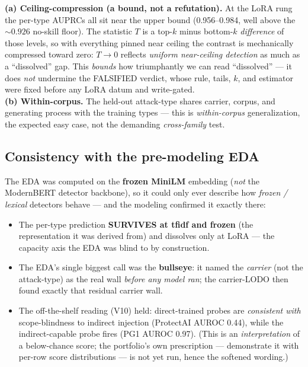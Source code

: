 \documentclass[11pt,parskip=half-]{scrartcl}
\newcommand{\arr}{\ensuremath{\rightarrow}}
\begin{document}
\begin{insightbox}
\textbf{(a) Ceiling-compression (a bound, not a refutation).} At the LoRA rung the per-type AUPRCs all
sit near the upper bound (0.956--0.984, well above the ${\sim}0.926$ no-skill floor). The statistic
$T$ is a top-$k$ minus bottom-$k$ \emph{difference} of those levels, so with everything pinned near
ceiling the contrast is mechanically compressed toward zero: $T\arr 0$ reflects \emph{uniform
near-ceiling detection} as much as a ``dissolved'' gap. This \emph{bounds} how triumphantly we can read
``dissolved'' --- it does \emph{not} undermine the FALSIFIED verdict, whose rule, tails, $k$, and
estimator were fixed before any LoRA datum and write-gated.\\[2pt]
\textbf{(b) Within-corpus.} The held-out attack-type shares carrier, corpus, and generating process
with the training types --- this is \emph{within-corpus} generalization, the expected easy case, not
the demanding \emph{cross-family} test.
\end{insightbox}

\subsection{Consistency with the pre-modeling EDA}

The EDA was computed on the \textbf{frozen MiniLM} embedding (\emph{not} the ModernBERT detector
backbone), so it could only ever describe how \emph{frozen / lexical} detectors behave --- and the
modeling confirmed it exactly there:

\begin{itemize}
  \item The per-type prediction \textbf{SURVIVES at tfidf and frozen} (the representation it was derived
    from) and dissolves only at LoRA --- the capacity axis the EDA was blind to by construction.
  \item The EDA's single biggest call was the \textbf{bullseye}: it named the \emph{carrier} (not the
    attack-type) as the real wall \emph{before any model ran}; the carrier-LODO then found exactly that
    residual carrier wall.
  \item The off-the-shelf reading (V10) held: direct-trained probes are \emph{consistent with}
    scope-blindness to indirect injection (ProtectAI AUROC 0.44), while the indirect-capable probe fires
    (PG1 AUROC 0.97). (This is an \emph{interpretation} of a below-chance score; the portfolio's own
    prescription --- demonstrate it with per-row score distributions --- is not yet run, hence the
    softened wording.)
\end{itemize}
\end{document}
